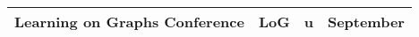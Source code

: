 \begin{table}[h]
\begin{tabular}{|l|l|c|r|}
\hline
Learning on Graphs Conference & LoG & u & September \\

\bottomrule
    \end{tabular}
\end{table}






